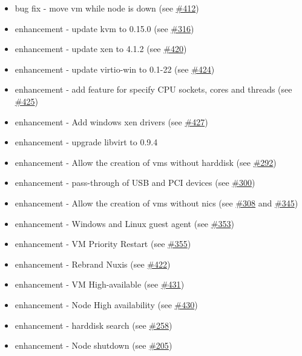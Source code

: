 \begin{itemize}
\item bug fix - move vm while node is down (see \href{https://srcmaster.eurotux.com/pm/p/etva/ticket/412}{\#412})
\item enhancement - update kvm to 0.15.0 (see \href{https://srcmaster.eurotux.com/pm/p/etva/ticket/316}{\#316})
\item enhancement - update xen to 4.1.2 (see \href{https://srcmaster.eurotux.com/pm/p/etva/ticket/420}{\#420})
\item enhancement - update virtio-win to 0.1-22 (see \href{https://srcmaster.eurotux.com/pm/p/etva/ticket/424}{\#424})
\item enhancement - add feature for specify CPU sockets, cores and threads (see \href{https://srcmaster.eurotux.com/pm/p/etva/ticket/425}{\#425})
\item enhancement - Add windows xen drivers (see \href{https://srcmaster.eurotux.com/pm/p/etva/ticket/427}{\#427})
\item enhancement - upgrade libvirt to 0.9.4
\item enhancement - Allow the creation of vms without harddisk (see \href{https://srcmaster.eurotux.com/pm/p/etva/ticket/292}{\#292})
\item enhancement - pass-through of USB and PCI devices (see \href{https://srcmaster.eurotux.com/pm/p/etva/ticket/300}{\#300})
\item enhancement - Allow the creation of vms without nics (see \href{https://srcmaster.eurotux.com/pm/p/etva/ticket/308}{\#308} and \href{https://srcmaster.eurotux.com/pm/p/etva/ticket/345}{\#345})
\item enhancement - Windows and Linux guest agent (see \href{https://srcmaster.eurotux.com/pm/p/etva/ticket/353}{\#353})
\item enhancement - VM Priority Restart (see \href{https://srcmaster.eurotux.com/pm/p/etva/ticket/355}{\#355})
\item enhancement - Rebrand Nuxis (see \href{https://srcmaster.eurotux.com/pm/p/etva/ticket/422}{\#422})
\item enhancement - VM High-available (see \href{https://srcmaster.eurotux.com/pm/p/etva/ticket/431}{\#431})
\item enhancement - Node High availability (see \href{https://srcmaster.eurotux.com/pm/p/etva/ticket/430}{\#430})
\item enhancement - harddisk search (see \href{https://srcmaster.eurotux.com/pm/p/etva/ticket/258}{\#258})
\item enhancement - Node shutdown (see \href{https://srcmaster.eurotux.com/pm/p/etva/ticket/205}{\#205})

\end{itemize}
